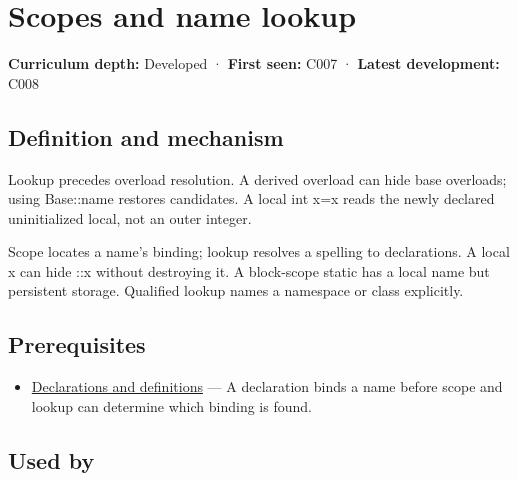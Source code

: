 \hypertarget{appendix-b12b31759da1}{}\label{referencestart:appendix-b12b31759da1}
\section{Scopes and name lookup}\label{appendix-b12b31759da1-scopes-and-name-lookup}

\hypertarget{appendix-b12b31759da1-scopes-and-name-lookup}{}

\textbf{Curriculum depth:} Developed · \textbf{First seen:} C007 · \textbf{Latest development:} C008

\begin{allmightroledefinition}

\subsection{Definition and mechanism}\label{appendix-b12b31759da1-definition-and-mechanism}

\hypertarget{appendix-b12b31759da1-definition-and-mechanism}{}

Lookup precedes overload resolution. A derived overload can hide base overloads; using Base::name restores candidates. A local int x=x reads the newly declared uninitialized local, not an outer integer.

\end{allmightroledefinition}

Scope locates a name's binding; lookup resolves a spelling to declarations. A local x can hide ::x without destroying it. A block-scope static has a local name but persistent storage. Qualified lookup names a namespace or class explicitly.

\subsection{Prerequisites}\label{appendix-b12b31759da1-prerequisites}

\hypertarget{appendix-b12b31759da1-prerequisites}{}

\begin{itemize}
\tightlist
\item
  \hyperref[appendix-2e4d494c2d94]{Declarations and definitions} --- A declaration binds a name before scope and lookup can determine which binding is found.
\end{itemize}

\subsection{Used by}\label{appendix-b12b31759da1-used-by}

